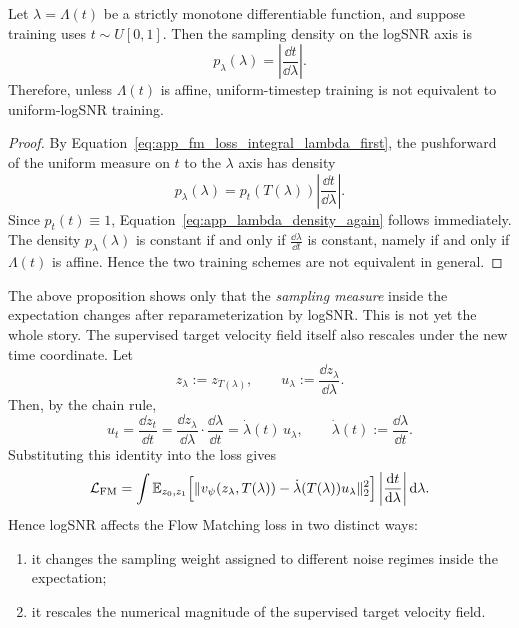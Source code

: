 \begin{proposition}
\label{prop:app_uniform_t_not_uniform_logsnr}
Let $\lambda=\Lambda(t)$ be a strictly monotone differentiable function, and suppose training uses $t\sim U[0,1]$. Then the sampling density on the logSNR axis is
\begin{equation}
p_{\lambda}(\lambda)=\left|\frac{\dd t}{\dd \lambda}\right|.
\label{eq:app_lambda_density_again}
\end{equation}
Therefore, unless $\Lambda(t)$ is affine, uniform-timestep training is not equivalent to uniform-logSNR training.
\end{proposition}

\begin{proof}
By Equation~\eqref{eq:app_fm_loss_integral_lambda_first}, the pushforward of the uniform measure on $t$ to the $\lambda$ axis has density
\[
p_{\lambda}(\lambda)=p_t(T(\lambda))\left|\frac{\dd t}{\dd \lambda}\right|.
\]
Since $p_t(t)\equiv 1$, Equation~\eqref{eq:app_lambda_density_again} follows immediately. The density $p_{\lambda}(\lambda)$ is constant if and only if $\frac{\dd \lambda}{\dd t}$ is constant, namely if and only if $\Lambda(t)$ is affine. Hence the two training schemes are not equivalent in general.
\end{proof}

The above proposition shows only that the \emph{sampling measure} inside the expectation changes after reparameterization by logSNR. This is not yet the whole story. The supervised target velocity field itself also rescales under the new time coordinate. Let
\begin{equation}
z_{\lambda}:=z_{T(\lambda)},
\qquad
u_{\lambda}:=\frac{\dd z_{\lambda}}{\dd \lambda}.
\label{eq:app_zlambda_ulambda}
\end{equation}
Then, by the chain rule,
\begin{equation}
u_t
=
\frac{\dd z_t}{\dd t}
=
\frac{\dd z_{\lambda}}{\dd \lambda}\cdot \frac{\dd \lambda}{\dd t}
=
\dot\lambda(t)\,u_{\lambda},
\qquad
\dot\lambda(t):=\frac{\dd \lambda}{\dd t}.
\label{eq:app_ut_scaling_with_lambda}
\end{equation}
Substituting this identity into the loss gives
\begin{equation}
\mathcal{L}_{\mathrm{FM}}
=
\int
\mathbb{E}_{z_0,z_1}
\Big[
\|v_{\psi}(z_{\lambda},T(\lambda))
-
\dot\lambda(T(\lambda))u_{\lambda}\|_2^2
\Big]
\left|\frac{\mathrm{d} t}{\mathrm{d} \lambda}\right|
\mathrm{d} \lambda.
\label{eq:app_fm_loss_lambda_with_ut}
\end{equation}
Hence logSNR affects the Flow Matching loss in two distinct ways:
\begin{enumerate}
    \item it changes the sampling weight assigned to different noise regimes inside the expectation;
    \item it rescales the numerical magnitude of the supervised target velocity field.
\end{enumerate}

